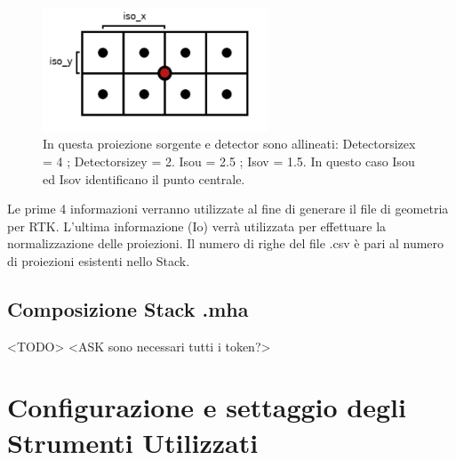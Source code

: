 \documentclass[a4paper,12pt, doubleside]{report}
\begin{document}
                    \begin{figure}[h]
                        \centering
                        \includegraphics[width=0.6\textwidth]{iso}
                        \caption{In questa proiezione sorgente e detector sono allineati: Detector\textunderscore size\textunderscore x = 4 ; Detector\textunderscore size\textunderscore y = 2. Iso\textunderscore u = 2.5 ; Iso\textunderscore v = 1.5. In questo caso Iso\textunderscore u ed Iso\textunderscore v identificano il punto centrale. }
                        \label{fig:iso}
                    \end{figure}
                    
                    Le prime 4 informazioni verranno utilizzate al fine di generare il file di geometria per RTK. L'ultima informazione (Io) verrà utilizzata per effettuare la normalizzazione delle proiezioni. Il numero di righe del file .csv è pari al numero di proiezioni esistenti nello Stack.
                    
            \subsection{Composizione Stack .mha} 
                <TODO>
                <ASK sono necessari tutti i token?>
          
            
        \section{Configurazione e settaggio degli Strumenti Utilizzati}
\end{document}
